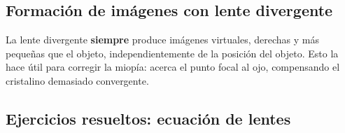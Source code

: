 \subsection{Formación de imágenes con lente divergente}

\begin{seccion}
La lente divergente \textbf{siempre} produce imágenes virtuales, derechas y más pequeñas que el objeto, independientemente de la posición del objeto. Esto la hace útil para corregir la miopía: acerca el punto focal al ojo, compensando el cristalino demasiado convergente.
\end{seccion}

\subsection{Ejercicios resueltos: ecuación de lentes}


